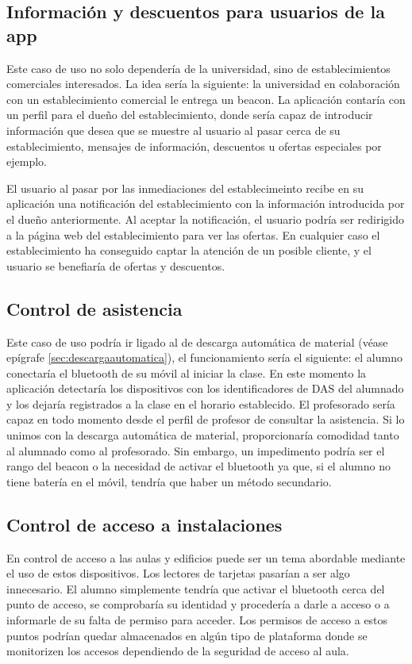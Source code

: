 \subsection{Información y descuentos para usuarios de la app}

Este caso de uso no solo dependería de la universidad, sino de establecimientos comerciales interesados. La idea sería la siguiente: la universidad en colaboración con un establecimiento comercial le entrega un beacon. La aplicación contaría con un perfil para el dueño del establecimiento, donde sería capaz de introducir información que desea que se muestre al usuario al pasar cerca de su establecimiento, mensajes de información, descuentos u ofertas especiales por ejemplo. 

El usuario al pasar por las inmediaciones del establecimeinto recibe en su aplicación una notificación del establecimiento con la información introducida por el dueño anteriormente. Al aceptar la notificación, el usuario podría ser redirigido a la página web del establecimiento para ver las ofertas. En cualquier caso el establecimiento ha conseguido captar la atención de un posible cliente, y el usuario se benefiaría de ofertas y descuentos. 

\subsection{Control de asistencia}

Este caso de uso podría ir ligado al de descarga automática de material (véase epígrafe \ref{sec:descargaautomatica}), el funcionamiento sería el siguiente: el alumno conectaría el bluetooth de su móvil al iniciar la clase. En este momento la aplicación detectaría los dispositivos con los identificadores de DAS del alumnado y los dejaría registrados a la clase en el horario establecido. El profesorado sería capaz en todo momento desde el perfil de profesor de consultar la asistencia. Si lo unimos con la descarga automática de material, proporcionaría comodidad tanto al alumnado como al profesorado. Sin embargo, un impedimento podría ser el rango del beacon o la necesidad de activar el bluetooth ya que, si el alumno no tiene batería en el móvil, tendría que haber un método secundario. 

\subsection{Control de acceso a instalaciones}

En control de acceso a las aulas y edificios puede ser un tema abordable mediante el uso de estos dispositivos. Los lectores de tarjetas pasarían a ser algo innecesario. El alumno simplemente tendría que activar el bluetooth cerca del punto de acceso, se comprobaría su identidad y procedería a darle a acceso o a informarle de su falta de permiso para acceder. Los permisos de acceso a estos puntos podrían quedar almacenados en algún tipo de plataforma donde se monitorizen los accesos dependiendo de la seguridad de acceso al aula.

